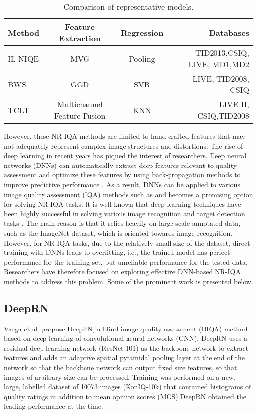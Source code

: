 \documentclass{article}
\begin{document}
\begin{table}[h!]
  \begin{center}
    \caption{Comparison of representative models.}
    \begin{tabular}{l|c|c|r}
      \textbf{Method} & \textbf{Feature Extraction} & \textbf{Regression} & \textbf{Databases}\\
      \hline
      IL-NIQE\cite{zhang2015feature} & MVG & Pooling & TID2013,CSIQ, LIVE, MD1,MD2\\
      BWS\cite{yang2018blind} & GGD & SVR & LIVE, TID2008, CSIQ\\
      TCLT\cite{wu2015blind} & Multichannel Feature Fusion & KNN &LIVE II,
CSIQ,TID2008
\\
    \end{tabular}
  \end{center}
\end{table}


However, these NR-IQA methods are limited to hand-crafted features that may not adequately represent complex image structures and distortions. The rise of deep learning in recent years has piqued the interest of researchers. Deep neural networks (DNNs) can automatically extract deep features relevant to quality assessment and optimize these features by using back-propagation methods to improve predictive performance \cite{yang2019survey}. As a result, DNNs can be applied to various image quality assessment (IQA) methods such as \cite{wu2019blind,meng2019new} and becomes a promising option for solving NR-IQA tasks. It is well known that deep learning techniques have been highly successful in solving various image recognition and target detection tasks \cite{krizhevsky2012imagenet,szegedy2015going,he2016deep,simonyan2014very}. The main reason is that it relies heavily on large-scale annotated data, such as the ImageNet dataset, which is oriented towards image recognition. However, for NR-IQA tasks, due to the relatively small size of the dataset, direct training with DNNs leads to overfitting, i.e., the trained model has perfect performance for the training set, but unreliable performance for the tested data. Researchers have therefore focused on exploring effective DNN-based NR-IQA methods to address this problem. Some of the prominent work is presented below.

\subsection{DeepRN}
\label{DeepRN}
Varga et al. \cite{varga2018deeprn}propose DeepRN, a blind image quality assessment (BIQA) method based on deep learning of convolutional neural networks (CNN). DeepRN uses a residual deep learning network (ResNet-101) as the backbone network to extract features and adds an adaptive spatial pyramidal pooling layer at the end of the network so that the backbone network can output fixed size features, so that images of arbitrary size can be processed. Training was performed on a new, large, labelled dataset of 10073 images (KonIQ-10k) that contained histograms of quality ratings in addition to mean opinion scores (MOS).DeepRN obtained the leading performance at the time.
\end{document}
